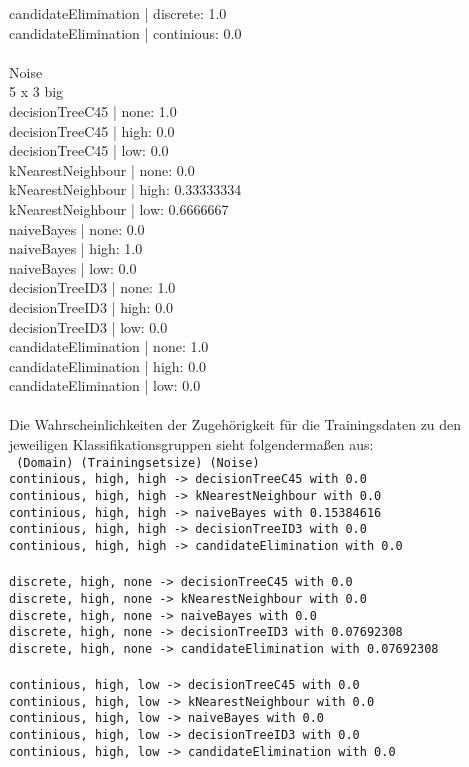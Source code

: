 \documentclass[a4paper]{article}
\begin{document}
{candidateElimination | discrete: 1.0 \\
candidateElimination | continious: 0.0 \\
\\
Noise \\
5 x 3 big \\
decisionTreeC45 | none: 1.0 \\
decisionTreeC45 | high: 0.0 \\
decisionTreeC45 | low: 0.0 \\
kNearestNeighbour | none: 0.0 \\
kNearestNeighbour | high: 0.33333334 \\
kNearestNeighbour | low: 0.6666667 \\
naiveBayes | none: 0.0 \\
naiveBayes | high: 1.0 \\
naiveBayes | low: 0.0 \\
decisionTreeID3 | none: 1.0 \\
decisionTreeID3 | high: 0.0 \\
decisionTreeID3 | low: 0.0 \\
candidateElimination | none: 1.0 \\
candidateElimination | high: 0.0 \\
candidateElimination | low: 0.0 \\}
\\
Die Wahrscheinlichkeiten der Zugehörigkeit für die Trainingsdaten zu den jeweiligen Klassifikationsgruppen sieht folgendermaßen aus: \\
\texttt{
(Domain) (Trainingsetsize) (Noise) \\
continious, high, high -> decisionTreeC45 with 0.0 \\
continious, high, high -> kNearestNeighbour with 0.0 \\
continious, high, high -> naiveBayes with 0.15384616 \\
continious, high, high -> decisionTreeID3 with 0.0 \\
continious, high, high -> candidateElimination with 0.0 \\
\\
discrete, high, none -> decisionTreeC45 with 0.0 \\
discrete, high, none -> kNearestNeighbour with 0.0 \\
discrete, high, none -> naiveBayes with 0.0 \\
discrete, high, none -> decisionTreeID3 with 0.07692308 \\
discrete, high, none -> candidateElimination with 0.07692308 \\
\\
continious, high, low -> decisionTreeC45 with 0.0 \\
continious, high, low -> kNearestNeighbour with 0.0 \\
continious, high, low -> naiveBayes with 0.0 \\
continious, high, low -> decisionTreeID3 with 0.0 \\
continious, high, low -> candidateElimination with 0.0 \\}
\end{document}
